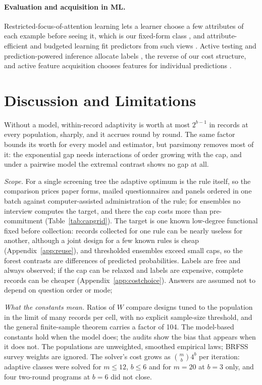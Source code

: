 \documentclass{article}
\begin{document}
\paragraph{Evaluation and acquisition in ML.} Restricted-focus-of-attention learning lets a learner choose a few attributes of each example before seeing it, which is our fixed-form class \citep{bendavid1998}, and attribute-efficient and budgeted learning fit predictors from such views \citep{cesa2011,hazan2012,lizotte2003,kapoor2005}. Active testing and prediction-powered inference allocate labels \citep{kossen2021,zrnic2024,angelopoulos2023}, the reverse of our cost structure, and active feature acquisition chooses features for individual predictions \citep{trapeznikov2013,nan2017,covert2023,vonkleist2025}.

\section{Discussion and Limitations}\label{sec:discussion}
Without a model, within-record adaptivity is worth at most $2^{b-1}$ in records at every population, sharply, and it accrues round by round. The same factor bounds its worth for every model and estimator, but parsimony removes most of it: the exponential gap needs interactions of order growing with the cap, and under a pairwise model the extremal contrast shows no gap at all. \nDiscussionSentence

\emph{Scope.} For a single screening tree the adaptive optimum is the rule itself, so the comparison prices paper forms, mailed questionnaires and panels ordered in one batch against computer-assisted administration of the rule; for ensembles no interview computes the target, and there the cap costs more than pre-commitment (Table~\ref{tab:capgrid}). The target is one known low-degree functional fixed before collection: records collected for one rule can be nearly useless for another, although a joint design for a few known rules is cheap (Appendix~\ref{app:reuse}), and thresholded ensembles exceed small caps, so the forest contrasts are differences of predicted probabilities. Labels are free and always observed; if the cap can be relaxed and labels are expensive, complete records can be cheaper (Appendix~\ref{app:costchoice}). Answers are assumed not to depend on question order or mode; \nOrderSentence{}

\emph{What the constants mean.} Ratios of $W$ compare designs tuned to the population in the limit of many records per cell, with no explicit sample-size threshold, and the general finite-sample theorem carries a factor of 104. The model-based constants hold when the model does; the audits show the bias that appears when it does not. The populations are unweighted, smoothed empirical laws; BRFSS survey weights are ignored. The solver's cost grows as $\binom mb4^b$ per iteration: adaptive classes were solved for $m\le12$, $b\le6$ and for $m=20$ at $b=3$ only, and four two-round programs at $b=6$ did not close.
\end{document}
